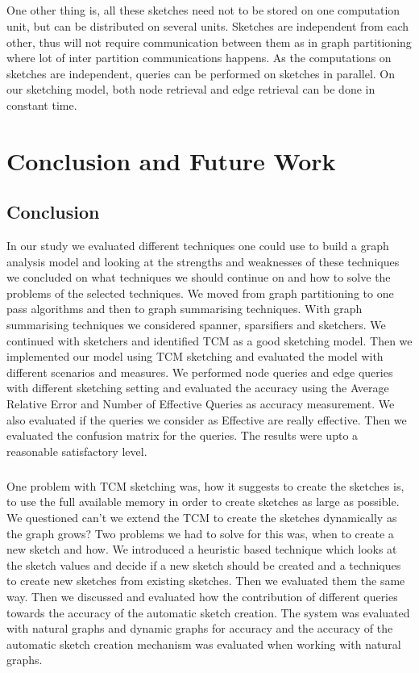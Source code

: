 \documentclass[12pt]{report}
\numberwithin{figure}{section}
\numberwithin{table}{section}
\begin{document}
\paragraph{}

One other thing is, all these sketches need not to be stored on one computation unit, but can be distributed on several units. Sketches are independent from each other, thus will not require communication between them as in graph partitioning where lot of inter partition communications happens. As the computations on sketches are independent, queries can be performed on sketches in parallel. On our sketching model, both node retrieval and edge retrieval can be done in constant time.  


\chapter{Conclusion and Future Work }

\section{Conclusion}

In our study we evaluated different techniques one could use to build a graph analysis model and looking at the strengths and weaknesses of these techniques we concluded on what techniques we should continue on and  how to solve the problems of the selected techniques. We moved from graph partitioning to one pass algorithms and then to graph summarising techniques. With graph summarising techniques we considered spanner, sparsifiers and sketchers. We continued with sketchers and identified TCM as a good sketching model. Then we implemented our model using TCM sketching and evaluated  the model with different scenarios and measures. We performed node queries and edge queries with different sketching setting and evaluated the accuracy using the Average Relative Error and Number of Effective Queries as accuracy  measurement. We also evaluated if the queries we consider as Effective are really effective. Then we evaluated the confusion matrix for the queries. The results were upto a reasonable satisfactory level. 

\paragraph{}

One problem with TCM sketching was, how it suggests to create the sketches is, to use the full available  memory in order to create sketches as large as possible. We questioned can't we extend the TCM to create the sketches dynamically as the graph grows? Two problems we had to solve for this was, when to create a new sketch and how. We introduced a heuristic based technique which looks at the sketch values and decide if a new sketch should be created and a techniques to create new sketches from existing sketches. Then we evaluated them the same way. Then we discussed and evaluated how the contribution of different queries towards the accuracy of the automatic sketch creation. The system was evaluated with natural graphs and dynamic graphs for accuracy and the accuracy of the automatic sketch creation mechanism was evaluated when working with natural graphs.
\end{document}
